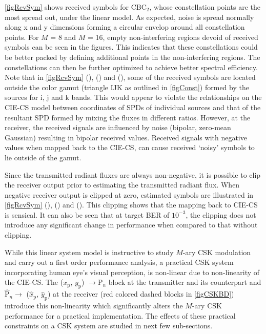 \figurename{ \ref{figRcvSym}} shows received symbols for CBC$_{2}$, whose constellation points are the most spread out, under the linear model. As expected, noise is spread normally along x and y dimensions forming a circular envelop around all constellation points. For $M$ = 8 and $M$ = 16, empty non-interfering regions devoid of received symbols can be seen in the figures. This indicates that these constellations could be better packed by defining additional points in the non-interfering regions. The constellations can then be further optimized to achieve better spectral efficiency. Note that in \figurename{ }\ref{figRcvSym} (),
() and (), some of the received
symbols are located outside the color gamut (triangle IJK
as outlined in \figurename{ }\ref{figConst}) formed by the sources for
i, j and k bands. This would appear to violate the relationships on the CIE-CS model between coordinates of SPDs of individual sources and that of the resultant SPD formed by mixing the fluxes in different ratios. However, at the receiver, the
received signals are influenced by noise (bipolar, zero-mean Gaussian)
resulting in bipolar received values. Received signals with negative values when mapped back to the CIE-CS, can cause received `noisy' symbols to lie outside of the gamut.

Since the transmitted radiant fluxes are always non-negative, it is possible to clip the receiver output prior to estimating the transmitted
radiant flux.  When negative receiver output is clipped at zero, estimated
symbols are illustrated in
\figurename{ }\ref{figRcvSym} (),
() and (). This
clipping shows that the mapping back to CIE-CS is sensical. It can also be seen that at target BER of $10^{-3}$, the clipping does not
introduce any significant change in performance when compared to that without clipping.

While this linear system model is instructive to study $M$-ary CSK modulation
and carry out a first order performance analysis, a practical CSK
system incorporating human eye's visual perception, is non-linear due to non-linearity of the CIE-CS. The ($x_{\text{p}}$, $y_{\text{p}}$) $\rightarrow  \text{P}_{n}$ block at the transmitter and its counterpart and $\hat{\text{P}}_{n}\rightarrow$ ($\hat{x}_{\text{p}}$, $\hat{y}_{\text{p}}$) at the receiver (red colored dashed
blocks in \figurename{ }\ref{figCSKBD}) introduce this non-linearity
which significantly alters the $M$-ary CSK performance for a practical
implementation. The effects of these practical constraints on a CSK
system are studied in next few sub-sections.
